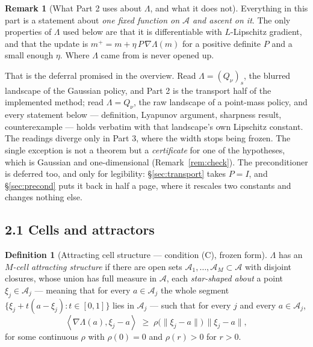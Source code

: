 \documentclass[11pt]{article}
\theoremstyle{definition}
\newtheorem{definition}[theorem]{Definition}
\newtheorem{remark}[theorem]{Remark}
\newcommand{\cA}{\mathcal{A}}
\newcommand{\ip}[2]{\left\langle #1, #2 \right\rangle}
\begin{document}
\begin{remark}[What Part 2 uses about $\Lambda$, and what it does not]
\label{rem:provenance}
Everything in this part is a statement about \emph{one fixed function on $\cA$ and
ascent on it}. The only properties of $\Lambda$ used below are that it is
differentiable with $L$-Lipschitz gradient, and that the update is
$m^+ = m + \eta\,P\,\nabla\Lambda(m)$ for a positive definite $P$ and a small
enough $\eta$. Where $\Lambda$ came from is never opened up.

That is the deferral promised in the overview. Read $\Lambda = (Q_\nu)_s$, the
blurred landscape of the Gaussian policy, and Part 2 is the transport half of the
implemented method; read $\Lambda = Q_\nu$, the raw landscape of a point-mass
policy, and every statement below --- definition, Lyapunov argument, sharpness
result, counterexample --- holds verbatim with that landscape's own Lipschitz
constant. The readings diverge only in Part 3, where the width stops being
frozen. The single exception is not a theorem but a \emph{certificate} for one of
the hypotheses, which is Gaussian and one-dimensional (Remark~\ref{rem:check}).
The preconditioner is deferred too, and only for legibility:
\S\ref{sec:transport} takes $P = I$, and \S\ref{sec:precond} puts it back in half
a page, where it rescales two constants and changes nothing else.
\end{remark}

\subsection*{2.1 Cells and attractors}

\begin{definition}[Attracting cell structure --- condition (C), frozen form]
\label{def:C}
$\Lambda$ has an \emph{$M$-cell attracting structure} if there are open sets
$\cA_1,\dots,\cA_M \subset \cA$ with disjoint closures, whose union has full
measure in $\cA$, each \emph{star-shaped about} a point $\xi_j \in \cA_j$ ---
meaning that for every $a \in \cA_j$ the whole segment
$\{\xi_j + t(a - \xi_j) : t \in [0,1]\}$ lies in $\cA_j$ --- such
that for every $j$ and every $a \in \cA_j$,
\begin{equation}\label{eq:star}
  \ip{\nabla \Lambda(a)}{\xi_j - a}
  \;\ge\; \rho\big(\|\xi_j - a\|\big)\,\|\xi_j - a\| ,
\end{equation}
for some continuous $\rho$ with $\rho(0)=0$ and $\rho(r) > 0$ for $r > 0$.
\end{definition}
\end{document}

